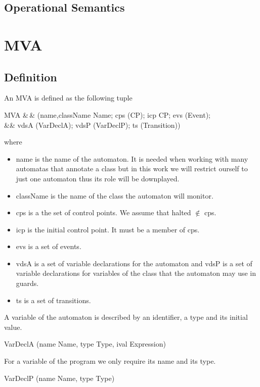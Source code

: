 \documentclass[a4paper,10pt]{article}
\begin{document}
\subsection{Operational Semantics}


\section{MVA}

\subsection{Definition}

An MVA is defined as the following tuple
\begin{haskell}\label{def:MVA}
MVA &\eqdef\,& (name,className \dcolon Name; cps \dcolon \powerset(CP); icp \dcolon CP; evs \dcolon
\powerset(Event);\\
  && vdsA \dcolon \powerset(VarDeclA); vdsP \dcolon \powerset(VarDeclP); ts \dcolon \powerset(Transition))
\end{haskell}
where
\begin{itemize}
  \item \<name\> is the name of the automaton. It is needed when working with many automatas that annotate a
class but in this work we will restrict ourself to just one automaton thus its role will be downplayed.
  \item \<className\> is the name of the class the automaton will monitor.
  \item \<cps\> is a the set of control points. We assume that \<halted\> $\notin$ \<cps\>.
  \item \<icp\> is the initial control point. It must be a member of \<cps\>.
  \item \<evs\> is a set of events.
  \item \<vdsA\> is a set of variable declarations for the automaton and \<vdsP\> is a set of variable
declarations for variables of the class that the automaton may use in guards.
  \item \<ts\> is a set of transitions.
\end{itemize}

A variable of the automaton is described by an identifier, a type and its initial value.
\begin{haskell}
VarDeclA \eqdef (name \dcolon Name, type \dcolon Type, ival \dcolon Expression)
\end{haskell}

For a variable of the program we only require its name and its type.
\begin{haskell}
VarDeclP \eqdef (name \dcolon Name, type \dcolon Type)
\end{haskell}
\end{document}
